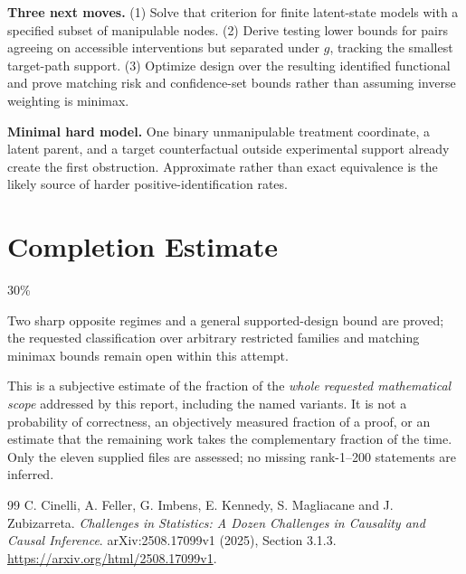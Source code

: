 \documentclass[11pt,a4paper]{article}
\theoremstyle{remark}\newtheorem{remark}[theorem]{Remark}
\begin{document}
\textbf{Three next moves.} (1) Solve that criterion for finite latent-state models with a specified subset of manipulable nodes. (2) Derive testing lower bounds for pairs agreeing on accessible interventions but separated under $g$, tracking the smallest target-path support. (3) Optimize design over the resulting identified functional and prove matching risk and confidence-set bounds rather than assuming inverse weighting is minimax.

\textbf{Minimal hard model.} One binary unmanipulable treatment coordinate, a latent parent, and a target counterfactual outside experimental support already create the first obstruction. Approximate rather than exact equivalence is the likely source of harder positive-identification rates.

\section{Completion Estimate}
30\%

Two sharp opposite regimes and a general supported-design bound are proved; the requested classification over arbitrary restricted families and matching minimax bounds remain open within this attempt.

This is a subjective estimate of the fraction of the \emph{whole requested mathematical scope} addressed by this report, including the named variants. It is not a probability of correctness, an objectively measured fraction of a proof, or an estimate that the remaining work takes the complementary fraction of the time. Only the eleven supplied files are assessed; no missing rank-1--200 statements are inferred.

\begin{thebibliography}{99}
 C. Cinelli, A. Feller, G. Imbens, E. Kennedy, S. Magliacane and J. Zubizarreta. \emph{Challenges in Statistics: A Dozen Challenges in Causality and Causal Inference}. arXiv:2508.17099v1 (2025), Section 3.1.3. \url{https://arxiv.org/html/2508.17099v1}.
\end{thebibliography}
\end{document}
